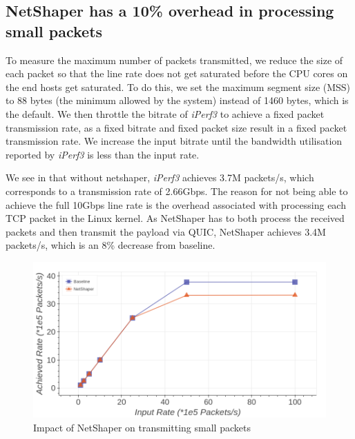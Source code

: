 \subsection{NetShaper has a 10\% overhead in processing small packets}
\label{subsec:netshaper-evaluation-num-packets}

To measure the maximum number of packets transmitted, we reduce the size of each packet so that the line rate does not get saturated before the CPU cores on the end hosts get saturated.
To do this, we set the maximum segment size (MSS) to 88 bytes (the minimum allowed by the system) instead of 1460 bytes, which is the default.
We then throttle the bitrate of \textit{iPerf3} to achieve a fixed packet transmission rate, as a fixed bitrate and fixed packet size result in a fixed packet transmission rate.
We increase the input bitrate until the bandwidth utilisation reported by \textit{iPerf3} is less than the input rate.

We see in  that without netshaper, \textit{iPerf3} achieves 3.7M packets/s, which corresponds to a transmission rate of 2.66Gbps.
The reason for not being able to achieve the full 10Gbps line rate is the overhead associated with processing each TCP packet in the Linux kernel.
As NetShaper has to both process the received packets and then transmit the payload via QUIC, NetShaper achieves 3.4M packets/s, which is an 8\% decrease from baseline.

\begin{figure}[!htb]
    \centering
    \includegraphics[width=\columnwidth]{figures/netshaper/evaluation/num_packets.png}
    \caption{Impact of NetShaper on transmitting small packets}
    \label{fig:netshaper-eval-num-packets}
\end{figure}